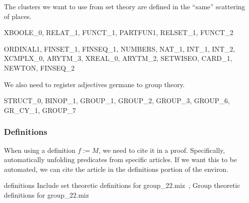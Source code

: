 The clusters we want to use from set theory are defined in the ``same''
scattering of places.

\nwenddocs{}\endmoddef\nwstartdeflinemarkup{}\nwenddeflinemarkup
XBOOLE_0, RELAT_1, FUNCT_1, PARTFUN1, RELSET_1, FUNCT_2
\nwendcode{}\nwdocspar

\nwenddocs{}\endmoddef\nwstartdeflinemarkup{}\nwenddeflinemarkup
ORDINAL1, FINSET_1, FINSEQ_1, NUMBERS, NAT_1, INT_1, INT_2, XCMPLX_0,
ARYTM_3, XREAL_0, ARYTM_2, SETWISEO, CARD_1, NEWTON, FINSEQ_2
\nwendcode{}\nwdocspar

We also need to register adjectives germane to group theory.

\nwenddocs{}\endmoddef\nwstartdeflinemarkup{}\nwenddeflinemarkup
STRUCT_0, BINOP_1, GROUP_1, GROUP_2, GROUP_3, GROUP_6, GR_CY_1, GROUP_7
\nwendcode{}\nwdocspar

\subsubsection{Definitions} When using a definition $f := M$, we need to cite it in
a proof. Specifically, automatically unfolding predicates from specific
articles. If we want this to be automated, we can cite the article in
the {\Tt{}definitions\nwendquote} portion of the {\Tt{}environ\nwendquote}.

\nwenddocs{}\endmoddef\nwstartdeflinemarkup{}\nwenddeflinemarkup
definitions \LA{}Include set theoretic definitions for \code{}group{\_}22.miz\edoc{}~{\nwtagstyle{}}\RA{},
  \LA{}Group theoretic definitions for \code{}group{\_}22.miz\edoc{}~{\nwtagstyle{}}\RA{}
\nwendcode{}\nwdocspar

